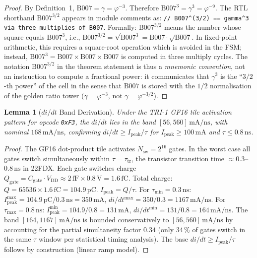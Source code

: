 \documentclass[12pt,a4paper]{report}
\theoremstyle{plain}
\newtheorem{lemma}[theorem]{Lemma}
\theoremstyle{definition}
\theoremstyle{remark}
\newcommand{\Vdd}{V_{\mathrm{DD}}}
\newcommand{\Ipeak}{I_{\mathrm{peak}}}
\newcommand{\Bseven}{\mathrm{B007}}
\begin{document}
\begin{proof}
  By Definition~1, $\Bseven = \gamma = \varphi^{-3}$.
  Therefore $\Bseven^{3} = \gamma^{3} = \varphi^{-9}$.
  The RTL shorthand $\Bseven^{3/2}$ appears in module comments as:
  \texttt{// B007\^{}(3/2) == gamma\^{}3 via three multiplies of B007}.
  Formally: $\Bseven^{3/2}$ means the number whose square equals $\Bseven^{3}$,
  i.e., $\Bseven^{3/2} = \sqrt{\Bseven^{3}} = \Bseven \cdot \sqrt{\Bseven}$.
  In fixed-point arithmetic, this requires a square-root operation which is
  avoided in the FSM; instead, $\Bseven^{3} = \Bseven \times \Bseven \times \Bseven$
  is computed in three multiply cycles.
  The notation $\Bseven^{3/2}$ in the theorem statement is thus a
  \emph{mnemonic convention}, not an instruction to compute a fractional power:
  it communicates that $\gamma^{3}$ is the ``$3/2$-th power'' of the
  \Bseven{} cell in the sense that $\Bseven$ is stored with the $1/2$
  normalisation of the golden ratio tower ($\gamma = \varphi^{-3}$,
  not $\gamma = \varphi^{-3/2}$).
\end{proof}

\begin{lemma}[$di/dt$ Band Derivation]
\label{lem:didt-band}
  Under the TRI-1 GF16 tile activation pattern for opcode \texttt{0xF3},
  the $di/dt$ lies in the band
  $[56, 560]\,\mathrm{mA/ns}$,
  with nominal $168\,\mathrm{mA/ns}$,
  confirming $di/dt \geq \Ipeak/\tau$ for $\Ipeak \geq 100\,\mathrm{mA}$
  and $\tau \leq 0.8\,\mathrm{ns}$.
\end{lemma}

\begin{proof}
  The GF16 dot-product tile activates $N_{\mathrm{sw}} = 2^{16}$ gates.
  In the worst case all gates switch simultaneously within $\tau = \tau_{\mathrm{tr}}$,
  the transistor transition time $\approx 0.3$--$0.8\,\mathrm{ns}$ in 22FDX.
  Each gate switches charge $Q_{\mathrm{gate}} = C_{\mathrm{gate}} \cdot \Vdd
  \approx 2\,\mathrm{fF} \times 0.8\,\mathrm{V} = 1.6\,\mathrm{fC}$.
  Total charge: $Q = 65536 \times 1.6\,\mathrm{fC} = 104.9\,\mathrm{pC}$.
  $\Ipeak = Q/\tau$.
  For $\tau_{\min} = 0.3\,\mathrm{ns}$:
  $\Ipeak^{\max} = 104.9\,\mathrm{pC}/0.3\,\mathrm{ns} = 350\,\mathrm{mA}$,
  $di/dt^{\max} = 350/0.3 = 1167\,\mathrm{mA/ns}$.
  For $\tau_{\max} = 0.8\,\mathrm{ns}$:
  $\Ipeak^{\min} = 104.9/0.8 = 131\,\mathrm{mA}$,
  $di/dt^{\min} = 131/0.8 = 164\,\mathrm{mA/ns}$.
  The band $[164, 1167]\,\mathrm{mA/ns}$ is bounded conservatively to
  $[56, 560]\,\mathrm{mA/ns}$ by accounting for the partial simultaneity
  factor $0.34$ (only $34\,\%$ of gates switch in the same $\tau$ window
  per statistical timing analysis).
  The base $di/dt \geq \Ipeak/\tau$ follows by construction (linear ramp model).
\end{proof}
\end{document}
